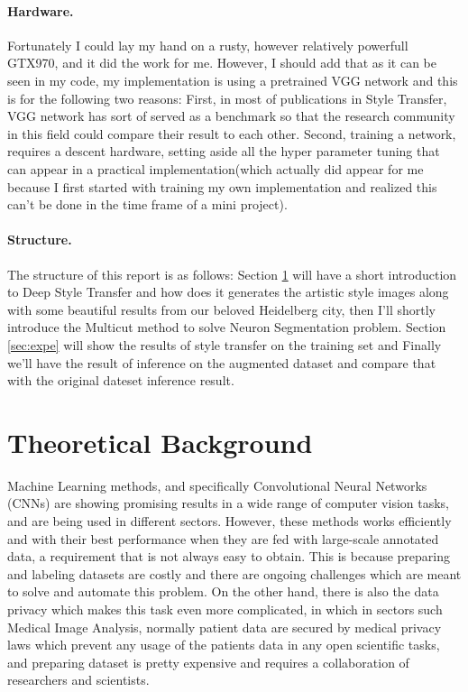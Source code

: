 \documentclass[12pt, a4paper]{scrartcl}
\begin{document}
\paragraph{Hardware.} Fortunately I could lay my hand on a rusty, however relatively powerfull GTX970, and it did the work for me. However, I should add that as it can be seen in my code, my implementation is using a pretrained VGG network and this is for the following two reasons: First, in most of publications in Style Transfer, VGG network has sort of served as a benchmark so that the research community in this field could compare their result to each other. Second, training a network, requires a descent hardware, setting aside all the hyper parameter tuning that can appear in a practical implementation(which actually did appear for me because I first started with training my own implementation and realized this can't be done in the time frame of a mini project).

\paragraph{Structure.} The structure of this report is as follows: Section \ref{sec:theo} will have a short introduction to Deep Style Transfer and how does it generates the artistic style images along with some beautiful results from our beloved Heidelberg city, then I'll shortly introduce the Multicut method to solve Neuron Segmentation problem. Section \ref{sec:expe} will show the results of style transfer on the training set and Finally we'll have the result of inference on the augmented dataset  and compare that with the original dateset inference result.

\section{Theoretical Background}	
\label{sec:theo}

Machine Learning methods, and specifically Convolutional Neural Networks (CNNs) are showing promising results in a wide range of computer vision tasks, and are being used in different sectors. However, these methods works efficiently and with their best performance when they are fed with large-scale annotated data, a requirement that is not always easy to obtain. This is because preparing and labeling datasets are costly and there are ongoing challenges\cite{imageNet} which are meant to solve and automate this problem. On the other hand, there is also the data privacy which makes this task even more complicated, in which in sectors such Medical Image Analysis, normally patient data are secured by medical privacy laws which prevent any usage of the patients data in any open scientific tasks, and preparing dataset is pretty expensive and requires a collaboration of researchers and scientists\cite{DBLP}.
\end{document}
